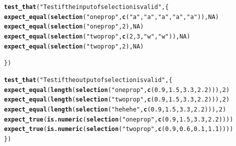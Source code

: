 \documentclass{article}\usepackage[]{graphicx}\usepackage[]{color}
\makeatletter
\newcommand{\hlnum}[1]{\textcolor[rgb]{0.686,0.059,0.569}{#1}}%
\newcommand{\hlstr}[1]{\textcolor[rgb]{0.192,0.494,0.8}{#1}}%
\newcommand{\hlstd}[1]{\textcolor[rgb]{0.345,0.345,0.345}{#1}}%
\newcommand{\hlkwd}[1]{\textcolor[rgb]{0.737,0.353,0.396}{\textbf{#1}}}%
\newenvironment{kframe}{%
 \def\at@end@of@kframe{}%
 \ifinner\ifhmode%
  \def\at@end@of@kframe{\end{minipage}}%
  \begin{minipage}{\columnwidth}%
 \fi\fi%
 \def\FrameCommand##1{\hskip\@totalleftmargin \hskip-\fboxsep
 \colorbox{shadecolor}{##1}\hskip-\fboxsep
     \hskip-\linewidth \hskip-\@totalleftmargin \hskip\columnwidth}%
 \MakeFramed {\advance\hsize-\width
   \@totalleftmargin\z@ \linewidth\hsize
   \@setminipage}}%
 {\par\unskip\endMakeFramed%
 \at@end@of@kframe}
\newenvironment{knitrout}{}{} %
\makeatother
\begin{document}
\begin{knitrout}
\color{fgcolor}\begin{kframe}
\begin{alltt}
\hlkwd{test_that}\hlstd{(}\hlstr{"Test if the input of selection is valid"}\hlstd{, \{}
  \hlkwd{expect_equal}\hlstd{(}\hlkwd{selection}\hlstd{(}\hlstr{"oneprop"}\hlstd{,}  \hlkwd{c}\hlstd{(}\hlstr{"a"}\hlstd{,}\hlstr{"a"}\hlstd{,}\hlstr{"a"}\hlstd{,}\hlstr{"a"}\hlstd{,}\hlstr{"a"}\hlstd{)),} \hlnum{NA}\hlstd{)}
  \hlkwd{expect_equal}\hlstd{(}\hlkwd{selection}\hlstd{(}\hlstr{"oneprop"}\hlstd{,}  \hlnum{2}\hlstd{),} \hlnum{NA}\hlstd{)}
  \hlkwd{expect_equal}\hlstd{(}\hlkwd{selection}\hlstd{(}\hlstr{"twoprop"}\hlstd{,} \hlkwd{c}\hlstd{(}\hlnum{2}\hlstd{,}\hlnum{3}\hlstd{,} \hlstr{"w"} \hlstd{,} \hlstr{"w"}\hlstd{)),} \hlnum{NA}\hlstd{)}
  \hlkwd{expect_equal}\hlstd{(}\hlkwd{selection}\hlstd{(}\hlstr{"twoprop"}\hlstd{,} \hlnum{2}\hlstd{),} \hlnum{NA}\hlstd{)}

\hlstd{\})}

\hlkwd{test_that}\hlstd{(}\hlstr{"Test if the output of selection is valid"}\hlstd{, \{}
  \hlkwd{expect_equal}\hlstd{(}\hlkwd{length}\hlstd{(}\hlkwd{selection}\hlstd{(}\hlstr{"oneprop"}\hlstd{,} \hlkwd{c}\hlstd{(}\hlnum{0.9}\hlstd{,}\hlnum{1.5}\hlstd{,}\hlnum{3.3}\hlstd{,}\hlnum{2.2}\hlstd{))),} \hlnum{2}\hlstd{)}
  \hlkwd{expect_equal}\hlstd{(}\hlkwd{length}\hlstd{(}\hlkwd{selection}\hlstd{(}\hlstr{"twoprop"}\hlstd{,} \hlkwd{c}\hlstd{(}\hlnum{0.9}\hlstd{,} \hlnum{1.5}\hlstd{,} \hlnum{3.3}\hlstd{,} \hlnum{2.2}\hlstd{))),} \hlnum{2}\hlstd{)}
  \hlkwd{expect_equal}\hlstd{(}\hlkwd{length}\hlstd{(}\hlkwd{selection}\hlstd{(}\hlstr{"hehehe"}\hlstd{,} \hlkwd{c}\hlstd{(}\hlnum{0.9}\hlstd{,} \hlnum{1.5}\hlstd{,} \hlnum{3.3}\hlstd{,} \hlnum{2.2}\hlstd{))),} \hlnum{2}\hlstd{)}
  \hlkwd{expect_true}\hlstd{(}\hlkwd{is.numeric}\hlstd{(}\hlkwd{selection}\hlstd{(}\hlstr{"oneprop"}\hlstd{,} \hlkwd{c}\hlstd{(}\hlnum{0.9}\hlstd{,} \hlnum{1.5}\hlstd{,} \hlnum{3.3}\hlstd{,} \hlnum{2.2}\hlstd{))))}
  \hlkwd{expect_true}\hlstd{(}\hlkwd{is.numeric}\hlstd{(}\hlkwd{selection}\hlstd{(}\hlstr{"twoprop"}\hlstd{,} \hlkwd{c}\hlstd{(}\hlnum{0.9}\hlstd{,}\hlnum{0.6}\hlstd{,}\hlnum{0.1}\hlstd{,}\hlnum{1.1}\hlstd{))))}
\hlstd{\})}
\end{alltt}
\end{kframe}
\end{knitrout}
\end{document}
